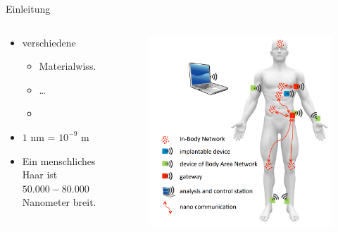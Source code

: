 \documentclass{beamer}
\begin{document}
%	

\begin{frame}[t]{Einleitung}
    \begin{columns}[t]
        \begin{column}{0.37\textwidth}
            \begin{itemize}
                \item verschiedene \textbf{\color{uzl_oceangreen}{Nanotechnologien}}
                \begin{itemize}
                    \item Materialwiss.
                    \item \dots
                    \item \textbf{\color{uzl_oceangreen}{Medizin}}
                \end{itemize}
                \item $1$ nm = $10^{-9}$ m
                \item Ein menschliches Haar ist $50.000 - 80.000$ Nanometer breit.
            \end{itemize}
        \end{column}

        \begin{column}{0.63\textwidth}
            \begin{figure}
                \centering 
                \includegraphics[width=0.9\columnwidth]{figures/In-Body_Networks.png}
            \end{figure}
        \end{column}   
    \end{columns}
\end{frame}
\end{document}
